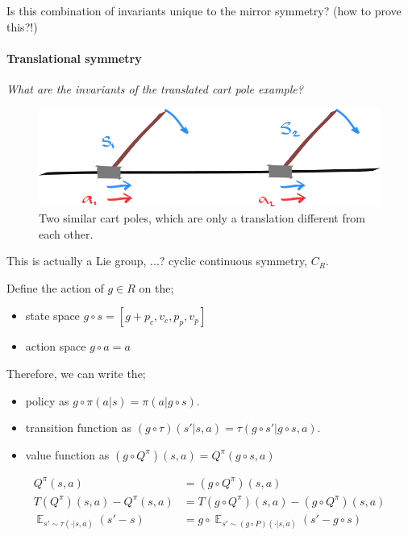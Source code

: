 Is this combination of invariants unique to the mirror symmetry? (how to prove this?!)

\paragraph{Translational symmetry}

\begin{displayquote}
\textit{What are the invariants of the translated cart pole example?}
\end{displayquote}

\begin{figure}[h!]
\centering
\includegraphics[width=1\textwidth,height=0.25\textheight]{../../pictures/drawings/cart-pole-translation.png}
\caption{Two similar cart poles, which are only a translation different from each other.}
\end{figure}

This is actually a Lie group, ...? cyclic continuous symmetry, $C_R$.


Define the action of $g \in R$ on the;

\begin{itemize}
	\tightlist
	\item state space $g \circ s = [g+p_c, v_c, p_p, v_p]$
	\item action space $g \circ a = a$
\end{itemize}

Therefore, we can write the;
\begin{itemize}
  \tightlist
 	\item policy as $g \circ \pi(a | s) = \pi(a | g \circ s)$.
	\item transition function as $(g \circ \tau)(s' | s, a) = \tau(g \circ  s'| g \circ  s,  a)$.
	\item value function as $(g \circ  Q^{\pi})(s, a) = Q^\pi(g \circ  s,  a)$
\end{itemize}

\begin{align*}
Q^\pi(s, a) &= (g \circ Q^{\pi})(s, a) \tag{expected return}\\
T(Q^\pi)(s,a) - Q^\pi(s,a) &=T(g \circ Q^\pi)(s, a) - (g \circ Q^\pi)(s,a) \tag{Bellman residual}\\
\mathop{\mathbb E}_{s' \sim \tau(\cdot| s, a)} (s' - s) &= g \circ \mathop{\mathbb E}_{s' \sim (g \circ P)(\cdot| s, a)} (s' - g \circ s) \tag{change in state}\\
\end{align*}


